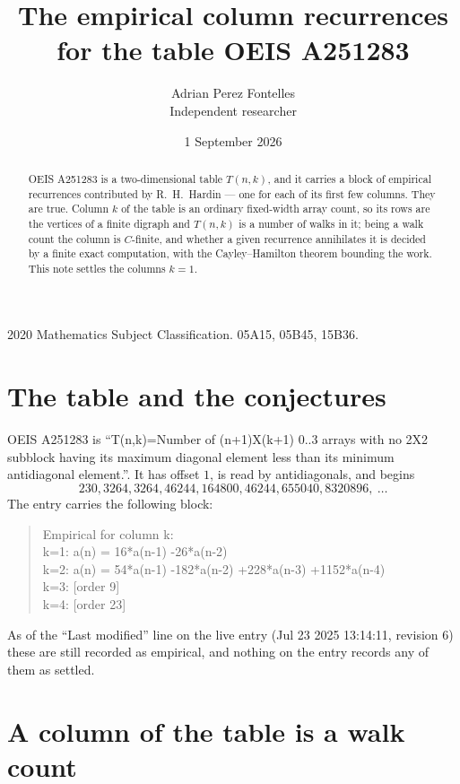 \documentclass[11pt,a4paper]{article}
\title{The empirical column recurrences for the table OEIS A251283}
\author{Adrian Perez Fontelles\\ \small Independent researcher}
\date{1 September 2026}
\theoremstyle{plain}
\theoremstyle{definition}
\begin{document}
\maketitle

\begin{abstract}
OEIS A251283 is a two-dimensional table $T(n,k)$, and it carries a block of empirical
recurrences contributed by R.~H.~Hardin --- one for each of its first few columns. They are
true. Column $k$ of the table is an ordinary fixed-width array count, so its rows are the
vertices of a finite digraph and $T(n,k)$ is a number of walks in it; being a walk count the
column is $C$-finite, and whether a given recurrence annihilates it is decided by a finite
exact computation, with the Cayley--Hamilton theorem bounding the work. This note settles the
columns $k=1$.
\end{abstract}

\noindent\small 2020 Mathematics Subject Classification. 05A15, 05B45, 15B36.\normalsize

\section{The table and the conjectures}

OEIS A251283 is ``T(n,k)=Number of (n+1)X(k+1) 0..3 arrays with no 2X2 subblock having its maximum diagonal element less than its minimum antidiagonal element.''. It has offset $1$, is
read by antidiagonals, and begins
\[
230, 3264, 3264, 46244, 164800, 46244, 655040, 8320896,\ \dots
\]
The entry carries the following block:
\begin{quote}\small
Empirical for column k:\\
k=1: a(n) = 16*a(n-1) -26*a(n-2)\\
k=2: a(n) = 54*a(n-1) -182*a(n-2) +228*a(n-3) +1152*a(n-4)\\
k=3: [order 9]\\
k=4: [order 23]\\
\end{quote}
As of the ``Last modified'' line on the live entry (Jul 23 2025 13:14:11, revision 6) these are still
recorded as empirical, and nothing on the entry records any of them as settled.

\section{A column of the table is a walk count}
\end{document}
